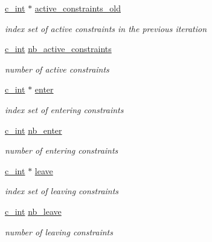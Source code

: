 \begin{DoxyCompactItemize}
\mbox{\hyperlink{global__opts_8h_aa3217a0f49d3e52b74e9dd830c44472f}{c\+\_\+int}} $\ast$ \mbox{\hyperlink{structQPALMCholmod_a9689c1013d1d38928c62c07d76fea9d3}{active\+\_\+constraints\+\_\+old}}
\begin{DoxyCompactList}\small\item\em index set of active constraints in the previous iteration \end{DoxyCompactList}\item 
\mbox{\hyperlink{global__opts_8h_aa3217a0f49d3e52b74e9dd830c44472f}{c\+\_\+int}} \mbox{\hyperlink{structQPALMCholmod_ad36c8474bed45333464cf3d877e783c5}{nb\+\_\+active\+\_\+constraints}}
\begin{DoxyCompactList}\small\item\em number of active constraints \end{DoxyCompactList}\item 
\mbox{\hyperlink{global__opts_8h_aa3217a0f49d3e52b74e9dd830c44472f}{c\+\_\+int}} $\ast$ \mbox{\hyperlink{structQPALMCholmod_aa8b56653cf6a253c025c7430b112d4ee}{enter}}
\begin{DoxyCompactList}\small\item\em index set of entering constraints \end{DoxyCompactList}\item 
\mbox{\hyperlink{global__opts_8h_aa3217a0f49d3e52b74e9dd830c44472f}{c\+\_\+int}} \mbox{\hyperlink{structQPALMCholmod_ae5447313a38c410f87578b1e24c54e8f}{nb\+\_\+enter}}
\begin{DoxyCompactList}\small\item\em number of entering constraints \end{DoxyCompactList}\item 
\mbox{\hyperlink{global__opts_8h_aa3217a0f49d3e52b74e9dd830c44472f}{c\+\_\+int}} $\ast$ \mbox{\hyperlink{structQPALMCholmod_a9b386126a4e4d1773152c32e40cb7ccf}{leave}}
\begin{DoxyCompactList}\small\item\em index set of leaving constraints \end{DoxyCompactList}\item 
\mbox{\hyperlink{global__opts_8h_aa3217a0f49d3e52b74e9dd830c44472f}{c\+\_\+int}} \mbox{\hyperlink{structQPALMCholmod_a3d848261dea95f43ff0ccf8c32db4622}{nb\+\_\+leave}}
\begin{DoxyCompactList}\small\item\em number of leaving constraints \end{DoxyCompactList}\item 

\end{DoxyCompactItemize}
